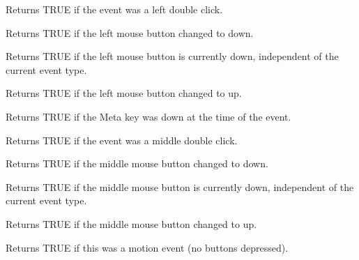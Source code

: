 Returns TRUE if the event was a left double click.



Returns TRUE if the left mouse button changed to down.



Returns TRUE if the left mouse button is currently down, independent
of the current event type.



Returns TRUE if the left mouse button changed to up.



Returns TRUE if the Meta key was down at the time of the event.



Returns TRUE if the event was a middle double click.



Returns TRUE if the middle mouse button changed to down.



Returns TRUE if the middle mouse button is currently down, independent
of the current event type.



Returns TRUE if the middle mouse button changed to up.



Returns TRUE if this was a motion event (no buttons depressed).



